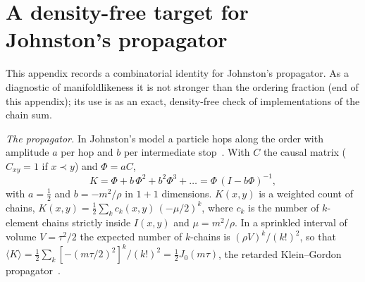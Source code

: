 \documentclass[12pt]{iopart} %
\providecommand{\DIFaddtex}[1]{{\protect\color{blue}\uwave{#1}}} %
\providecommand{\DIFaddbegin}{} %
\providecommand{\DIFaddend}{} %
\providecommand{\DIFadd}[1]{\texorpdfstring{\DIFaddtex{#1}}{#1}} %
\providecommand{\DIFaddincludegraphics}[2][]{{\color{blue}\fbox{\DIFOincludegraphics[#1]{#2}}}} %
\DeclareRobustCommand{\DIFaddbegin}{\DIFOaddbegin \let\includegraphics\DIFaddincludegraphics} %
\DeclareRobustCommand{\DIFaddend}{\DIFOaddend \let\includegraphics\DIFOincludegraphics} %
\begin{document}
\appendix
\section{A density-free target for Johnston's propagator}\label{app:prop}
This appendix records a combinatorial identity for Johnston's propagator. As a diagnostic of manifoldlikeness it is not stronger than the ordering fraction (\DIFaddbegin \DIFadd{see the }\DIFaddend end of this appendix); its use is as an exact, density-free check of implementations of the chain sum.

\emph{The propagator.} In Johnston's model a particle hops along the order with amplitude $a$ per hop and $b$ per intermediate stop~\cite{Johnston08}. With $C$ the causal matrix ($C_{xy}=1$ if $x\prec y$) and $\Phi=aC$,
\begin{equation}
K=\Phi+b\,\Phi^2+b^2\Phi^3+\dots=\Phi\,(I-b\Phi)^{-1},
\end{equation}
with $a=\tfrac12$ and $b=-m^2/\rho$ in $1+1$ dimensions. $K(x,y)$ is a weighted count of chains, $K(x,y)=\tfrac12\sum_k c_k(x,y)\,(-\mu/2)^k$, where $c_k$ is the number of $k$-element chains strictly inside $I(x,y)$ and $\mu=m^2/\rho$. In a sprinkled interval of volume $V=\tau^2/2$ the expected number of $k$-chains is $(\rho V)^k/(k!)^2$, so that $\langle K\rangle=\tfrac12\sum_k[-(m\tau/2)^2]^k/(k!)^2=\tfrac12J_0(m\tau)$, the retarded Klein--Gordon propagator~\cite{Johnston08}.
\end{document}
